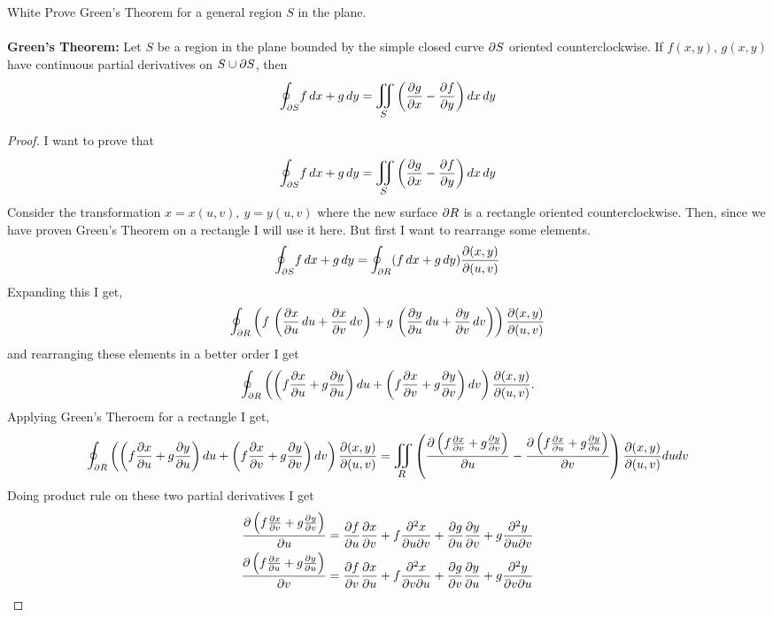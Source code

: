 \documentclass[titlepage]{article}
\begin{document}
\begin{cproblem}{3}{White}
Prove Green's Theorem for a general region $S$ in the plane.\\ \\
\textbf{Green's Theorem:} Let $S$ be a region in the plane bounded by the simple closed curve $\partial S$ oriented counterclockwise. If $f(x,y), \, g(x,y)$ have continuous partial derivatives on $S \cup \partial S$, then
$$\mathlarger\oint_{\p S} f\,dx + g\,dy = \bigiint{S}{}\left(\frac{\p g}{\p x} - \frac{\p f}{\p y}\right)dx\,dy$$
\end{cproblem}
\begin{proof}
I want to prove that
$$\mathlarger\oint_{\p S}f\,dx + g\,dy = \bigiint{S}{}\left(\frac{\p g}{\p x} - \frac{\p f}{\p y} \right) dx\,dy$$
Consider the transformation $x = x(u,v), \ y= y(u,v)$ where the new surface $\partial R$ is a rectangle oriented counterclockwise. Then, since we have proven Green's Theorem on a rectangle I will use it here. But first I want to rearrange some elements.
$$\mathlarger\oint_{\p S}f\,dx + g\,dy = \mathlarger\oint_{\p R}(f\,dx + g\,dy) \frac{\p (x,y)}{\p (u,v)}$$
Expanding this I get,
$$ \mathlarger\oint_{\p R}\left(f\,\left(\frac{\p x}{\p u}\,du +\frac{\p x}{\p v}\,dv\right) + g\,\left(\frac{\p y}{\p u}\,du +\frac{\p y}{\p v}\,dv\right)\right) \frac{\p (x,y)}{\p (u,v)}$$
and rearranging these elements in a better order I get
$$\mathlarger\oint_{\p R} \left(\left(f\frac{\p x}{\p u} + g\frac{\p y}{\p u}\right)du + \left(f\frac{\p x}{\p v} + g\frac{\p y}{\p v}\right)dv\right) \frac{\p (x,y)}{\p (u,v)}.$$
Applying Green's Theroem for a rectangle I get,
$$ \mathlarger\oint_{\p R} \left(\left(f\frac{\p x}{\p u} + g\frac{\p y}{\p u}\right)du + \left(f\frac{\p x}{\p v} + g\frac{\p y}{\p v}\right)dv\right) \frac{\p (x,y)}{\p (u,v)} = \bigiint{R}{} \left( \frac{\p \left(f\frac{\p x}{\p v} + g\frac{\p y}{\p v}\right)}{\p u} - \frac{\p \left(f\frac{\p x}{\p u} + g\frac{\p y}{\p u}\right)}{\p v}\right) \frac{\p (x,y)}{\p (u,v)} dudv$$
Doing product rule on these two partial derivatives I get
\begin{align*}
\frac{\partial \left(f\frac{\partial x}{\partial v} + g\frac{\partial y}{\partial v}\right)}{\partial u} &=  \frac{\partial f}{\partial u}\frac{\partial x}{\partial v} + f\frac{\partial^2 x}{\partial u \partial v} + \frac{\partial g}{\partial u} \frac{\partial y}{\partial v} + g\frac{\partial^2 y}{\partial u \partial v}\\
\frac{\partial \left(f\frac{\partial x}{\partial u} + g\frac{\partial y}{\partial u}\right)}{\partial v} &= \frac{\partial f}{\partial v}\frac{\partial x}{\partial u} + f\frac{\partial^2 x}{\partial v \partial u} + \frac{\partial g}{\partial v} \frac{\partial y}{\partial u} + g\frac{\partial^2 y}{\partial v \partial u}
\end{align*}

\end{proof}
\end{document}
